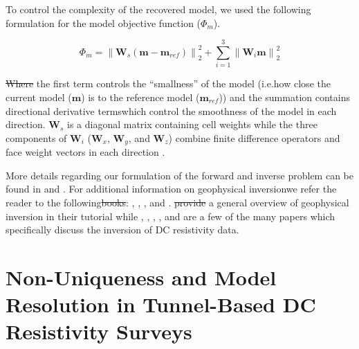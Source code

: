 \documentclass[preprint,authoryear,12pt]{elsarticle}
\providecommand{\DIFaddtex}[1]{{\protect\color{blue}\uwave{#1}}} %
\providecommand{\DIFdeltex}[1]{{\protect\color{red}\sout{#1}}}                      %
\providecommand{\DIFaddbegin}{} %
\providecommand{\DIFaddend}{} %
\providecommand{\DIFdelbegin}{} %
\providecommand{\DIFdelend}{} %
\providecommand{\DIFadd}[1]{\texorpdfstring{\DIFaddtex{#1}}{#1}} %
\providecommand{\DIFdel}[1]{\texorpdfstring{\DIFdeltex{#1}}{}} %
\begin{document}
To control the complexity of the recovered model, we used the following formulation for the model objective function ($\Phi_{m}$).

\begin{equation}
\label{eq:Phi_m}
  \Phi_m = \left\|\mathbf{W}_s(\mathbf{m} - \mathbf{m}_{ref})\right\|_2^2 + \sum^{3}_{i=1}\left\|\mathbf{W}_i\mathbf{m}\right\|_2^2
\end{equation}

\noindent \DIFdelbegin \DIFdel{Where }\DIFdelend \DIFaddbegin \DIFadd{where }\DIFaddend the first term controls the ``smallness'' of the model (i.e.\DIFaddbegin \DIFadd{, }\DIFaddend how close the current model ($\mathbf{m}$) is to the reference model ($\mathbf{m}_{ref}$)) and the summation contains directional derivative terms\DIFaddbegin \DIFadd{, }\DIFaddend which control the smoothness of the model in each direction. $\mathbf{W}_s$ is a diagonal matrix containing cell weights while the three components of $\mathbf{W}_i$ ($\mathbf{W}_x$, $\mathbf{W}_y$, and $\mathbf{W}_z$) combine finite difference operators and face weight vectors in each direction \citep{Oldenburg2005}.

More details regarding our formulation of the forward and inverse problem can be found in \citet{Mitchell2016a} and \citet{Mitchell2020}. For additional information on geophysical inversion\DIFaddbegin \DIFadd{, }\DIFaddend we refer the reader to the following\DIFdelbegin \DIFdel{books}\DIFdelend : \citet{Menke1984}, \citet{Parker1994}, \citet{Aster2012}, and \citet{Haber2014}. \citet{Oldenburg2005} \DIFdelbegin \DIFdel{provide }\DIFdelend \DIFaddbegin \DIFadd{provided }\DIFaddend a general overview of geophysical inversion in their tutorial while \citet{Li1994}, \citet{LaBrecque1996}, \citet{Loke1996}, \citet{Ramirez1996}, and \citet{Loke2013} are a few of the many papers which specifically discuss the inversion of DC resistivity data.


\section{Non-Uniqueness and Model Resolution in Tunnel-Based DC Resistivity Surveys}
\label{sec:Resolution_&_NonUniqueness}
\end{document}
